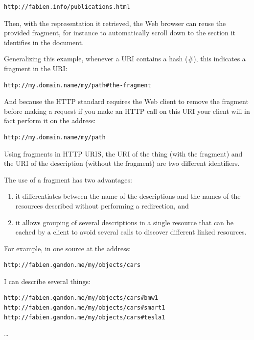 \begin{lstlisting}
http://fabien.info/publications.html
\end{lstlisting}

Then, with the representation it retrieved, the Web browser can reuse
the provided fragment, for instance to automatically scroll down to the
section it identifies in the document.

Generalizing this example, whenever a URI contains a hash (\#), this
indicates a fragment in the URI:

\begin{lstlisting}
http://my.domain.name/my/path#the-fragment
\end{lstlisting}


And because the HTTP standard requires the Web client to remove the
fragment before making a request if you make an HTTP call on this URI
your client will in fact perform it on the address:

\begin{lstlisting}
http://my.domain.name/my/path
\end{lstlisting}


Using fragments in HTTP URIS, the URI of the thing (with the fragment)
and the URI of the description (without the fragment) are two different
identifiers.

The use of a fragment has two advantages:

\begin{enumerate}
\def\labelenumi{\arabic{enumi}.}
\item
  it differentiates between the name of the descriptions and the
  names of the resources described without performing a redirection, and
\item
  it allows grouping of several descriptions in a single resource that can be
  cached by a client to avoid several calls to discover different linked resources.
\end{enumerate}

For example, in one source at the address:

\begin{lstlisting}
http://fabien.gandon.me/my/objects/cars
\end{lstlisting}


I can describe several things:


\begin{lstlisting}
http://fabien.gandon.me/my/objects/cars#bmw1
http://fabien.gandon.me/my/objects/cars#smart1
http://fabien.gandon.me/my/objects/cars#tesla1
\end{lstlisting}
\ldots{} 

